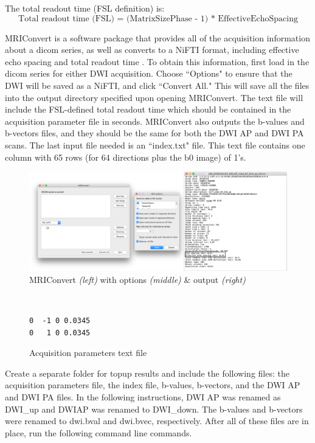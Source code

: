 The total readout time (FSL definition) is:
\[
\text{Total readout time (FSL) = (MatrixSizePhase - 1) * EffectiveEchoSpacing}
\]

MRIConvert is a software package that provides all of the acquisition information about a dicom series, as well as converts to a NiFTI format, including effective echo spacing and total readout time \cite{ref:mriconvert}. To obtain this information, first load in the dicom series for either DWI acquisition. Choose ``Options" to ensure that the DWI will be saved as a NiFTI, and click ``Convert All." This will save all the files into the output directory specified upon opening MRIConvert. The text file will include the FSL-defined total readout time which should be contained in the acquisition parameter file in seconds. MRIConvert also outputs the b-values and b-vectors files, and they should be the same for both the DWI AP and DWI PA scans. The last input file needed is an ``index.txt" file. This text file contains one column with 65 rows (for 64 directions plus the b0 image) of 1's.

\begin{figure}[H]
    \centering
    \includegraphics[width=\textwidth]{Figures/combined}
    \caption{MRIConvert \textit{(left)} with options \textit{(middle)} \& output \textit{(right)} }
    \label{fig:mri_convert}
\end{figure}

\begin{figure}[H]
\centering
{\tt
\begin{varwidth}{\linewidth}
\begin{verbatim}
0  -1 0 0.0345
0   1 0 0.0345
\end{verbatim}
\end{varwidth}
}
\label{fig:acq}
\caption{Acquisition parameters text file}
\end{figure}

Create a separate folder for topup results and include the following files: the acquisition parameters file, the index file, b-values, b-vectors, and the DWI AP and DWI PA files. In the following instructions, DWI AP was renamed as DWI\_up and DWIAP was renamed to DWI\_down. The b-values and b-vectors were renamed to dwi.bval and dwi.bvec, respectively. After all of these files are in place, run the following command line commands.

